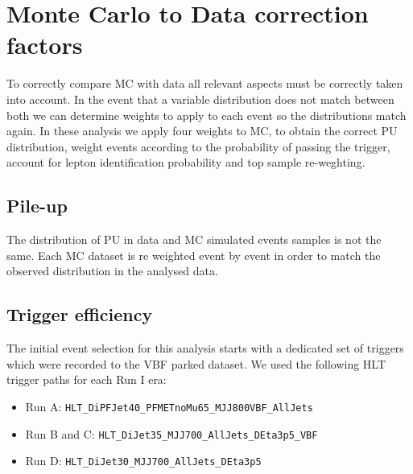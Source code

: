 \section{Monte Carlo to Data correction factors}


To correctly compare \gls{MC} with data all relevant aspects must be correctly taken into account. In the event that a variable distribution does not match between both we can determine weights to apply to each event so the distributions match again. In these analysis we apply four weights to \gls{MC}, to obtain the correct \gls{PU} distribution, weight events according to the probability of passing the trigger, account for lepton identification probability and top sample re-weghting.

\subsection{Pile-up}


The distribution of \gls{PU} in data and \gls{MC} simulated events samples is not the same. Each \gls{MC} dataset is re weighted event by event in order to match the observed distribution in the analysed data.

\subsection{Trigger efficiency}
\label{SUBSECTION:ParkedDataAnalysis_CorrectionFactors_TriggerEfficiency}


The initial event selection for this analysis starts with a dedicated set of triggers which were recorded to the \gls{VBF} parked dataset. We used the following \gls{HLT} trigger paths for each Run I era:

\begin{itemize}
  \item Run A:       \verb!HLT_DiPFJet40_PFMETnoMu65_MJJ800VBF_AllJets!
  \item Run B and C: \verb!HLT_DiJet35_MJJ700_AllJets_DEta3p5_VBF!
  \item Run D:       \verb!HLT_DiJet30_MJJ700_AllJets_DEta3p5!
\end{itemize}

